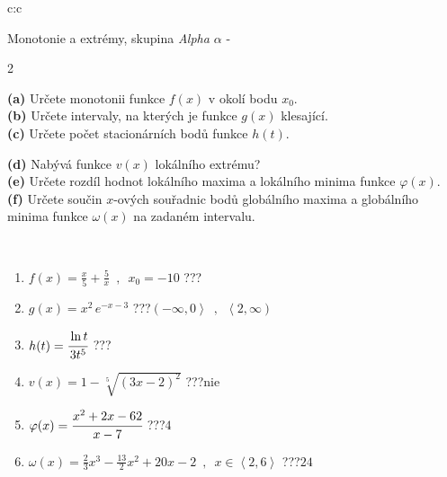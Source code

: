 \documentclass[10pt]{report}
\begin{document}
\thispagestyle{empty}
\begin{tabular}{c:c}
\begin{minipage}[c][104.5mm][t]{0.5\linewidth}
\begin{center}
\vspace{7mm}
{\huge Monotonie a extrémy, skupina \textit{Alpha $\alpha$} -}\\[5mm]
\begin{minipage}{0.95\linewidth}
\begin{center}
{\small \begin{multicols}{2} \raggedright
\textbf{(a)} Určete monotonii funkce \(f(x)\) v okolí bodu \(x_0\). \\[1mm]
\textbf{(b)} Určete intervaly, na kterých je funkce \(g(x)\) klesající. \\[1mm]
\textbf{(c)} Určete počet stacionárních bodů funkce \(h(t)\). \par \columnbreak
\textbf{(d)} Nabývá funkce \(v(x)\) lokálního extrému? \\[1mm]
\textbf{(e)} Určete rozdíl hodnot lokálního maxima a lokálního minima funkce \(\varphi(x)\). \\[1mm]
\textbf{(f)} Určete součin \(x\)-ových souřadnic bodů globálního maxima a globálního minima funkce \(\omega(x)\) na zadaném intervalu. \\[1mm]
\end{multicols}
}
\end{center}
\end{minipage}
\\[4mm]
\begin{minipage}{0.79\linewidth}
\begin{center}
\begin{varwidth}{\linewidth}
\begin{enumerate}
\normalsize
\item $f(x)=\frac{x}{5}+\frac{5}{x} \enspace , \enspace x_0=-10$\quad \dotfill\; ???\;\dotfill \quad {}
\item $g(x)=x^2\, e^{-x-3}$\quad \dotfill\; ???\;\dotfill \quad $\left(-\infty , 0\right\rangle\enspace , \enspace \left\langle2 , \infty\right)$
\item $h(t)=\cfrac{\ln t}{3t^5}$\quad \dotfill\; ???\;\dotfill {}
\item $v(x)=1-\sqrt[5]{(3x-2)^2}$\quad \dotfill\; ???\;\dotfill \quad $\text{nie}$
\item $\varphi(x)=\cfrac{x^2+2x-62}{x-7}$\quad \dotfill\; ???\;\dotfill \quad $4$
\item $\omega(x)=\frac{2}{3}x^3-\frac{13}{2}x^2+20x-2 \enspace , \enspace x\in\left\langle2 , 6\right\rangle$\quad \dotfill\; ???\;\dotfill \quad $24$

\end{enumerate}
\end{varwidth}
\end{center}
\end{minipage}
\end{center}
\end{minipage}
\end{tabular}
\end{document}
